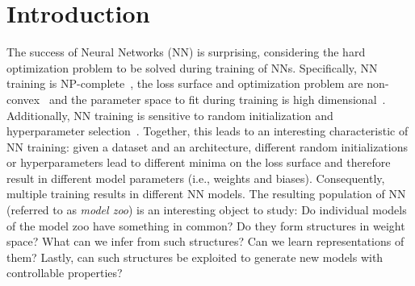 \section{Introduction}
%

%
The success of Neural Networks (NN) is surprising, considering the hard optimization problem to 
be solved during training of NNs. Specifically, NN training is NP-complete~\citep{blumTraining3NodeNeural1988}, 
the loss surface and optimization problem are non-convex~\citep{dauphinIdentifyingAttackingSaddle2014,goodfellowQualitativelyCharacterizingNeural2015, lecunDeepLearning2015} and the parameter space to fit during training is high dimensional~\citep{brownLanguageModelsAre2020}. 
Additionally, NN training is sensitive to random initialization  and hyperparameter selection~\citep{haninHowStartTraining2018,liVisualizingLossLandscape2018}.
%
%
Together, this leads to an interesting characteristic of NN training: given a dataset and an architecture, different random initializations or hyperparameters lead to different minima on the loss surface and therefore result in different model parameters (i.e., weights and biases). Consequently, multiple training results in different NN models.
%
The resulting population of NN (referred to as \textit{model zoo})
is an interesting object to study: Do individual models of the model zoo have something in common? 
Do they form structures in weight space?
What can we infer from such structures?
Can we learn representations of them?
Lastly, can such structures be exploited to generate new models with controllable properties?


%
%

